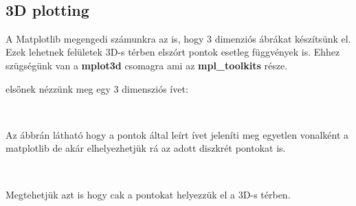 \begin{python}

\end{python}

    \begin{center}
    \end{center}
    { \hspace*{\fill} \\}
    
    \subsection{3D plotting}\label{d-plotting}

    A Matplotlib megengedi számunkra az is, hogy 3 dimenziós ábrákat
készítsünk el. Ezek lehetnek felületek 3D-s térben elszórt pontok
esetleg függvények is. Ehhez szügségünk van a \textbf{mplot3d} csomagra
ami az \textbf{mpl\_toolkits} része.

    elsőnek nézzünk meg egy 3 dimensziós ívet:

\begin{python}

\end{python}

    \begin{center}
    \end{center}
    { \hspace*{\fill} \\}
    
    Az ábbrán látható hogy a pontok által leírt ívet jeleníti meg egyetlen
vonalként a matplotlib de akár elhelyezhetjük rá az adott diszkrét
pontokat is.

\begin{python}

\end{python}

    \begin{center}
    \end{center}
    { \hspace*{\fill} \\}
    
    Megtehetjük azt is hogy cak a pontokat helyezzük el a 3D-s térben.

\begin{python}

\end{python}

